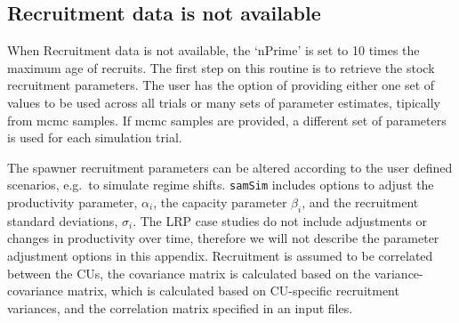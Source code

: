 \documentclass[11pt]{book}
\begin{document}
\hypertarget{recruitment-data-is-not-available}{%
\subsection{Recruitment data is not available}\label{recruitment-data-is-not-available}}

When Recruitment data is not available, the `nPrime' is set to 10 times the maximum age of recruits. The first step on this routine is to retrieve the stock recruitment parameters. The user has the option of providing either one set of values to be used across all trials or many sets of parameter estimates, tipically from mcmc samples. If mcmc samples are provided, a different set of parameters is used for each simulation trial.

The spawner recruitment parameters can be altered according to the user defined scenarios, e.g.~to simulate regime shifts. \texttt{samSim} includes options to adjust the productivity parameter, \(\alpha_{i}\), the capacity parameter \(\beta_{i}\), and the recruitment standard deviations, \(\sigma_{i}\). The LRP case studies do not include adjustments or changes in productivity over time, therefore we will not describe the parameter adjustment options in this appendix. Recruitment is assumed to be correlated between the CUs, the covariance matrix is calculated based on the variance-covariance matrix, which is calculated based on CU-specific recruitment variances, and the correlation matrix specified in an input files.
\end{document}
